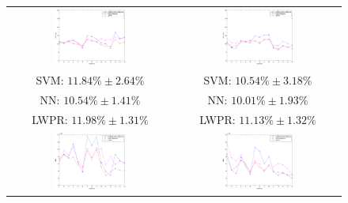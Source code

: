 \begin{figure}[!ht] \centering
  \begin{tabular}{cc}
    \includegraphics[width=0.45\textwidth]{figs/fig_err_regr_resCrossBestOnDay1} &
    \includegraphics[width=0.45\textwidth]{figs/fig_err_regr_resCrossBestOnDay2} \\
     SVM: $11.84\% \pm 2.64\%$ &  SVM: $10.54\% \pm 3.18\%$ \\
      NN: $10.54\% \pm 1.41\%$ &   NN: $10.01\% \pm 1.93\%$ \\
    LWPR: $11.98\% \pm 1.31\%$ & LWPR: $11.13\% \pm 1.32\%$ \\
    \includegraphics[width=0.45\textwidth]{figs/fig_MSE_regr_resCrossBestOnDay1} &
    \includegraphics[width=0.45\textwidth]{figs/fig_MSE_regr_resCrossBestOnDay2} \\

\end{tabular}
\end{figure}
